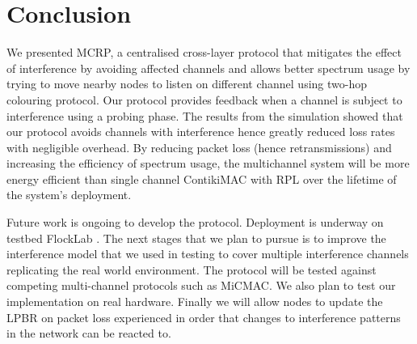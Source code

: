 \section{Conclusion}
\label{sec:conclusion}


We presented MCRP, a centralised cross-layer protocol that mitigates the effect of interference by avoiding affected channels and allows better spectrum usage by trying to move nearby nodes to listen on different channel using two-hop colouring protocol. Our protocol provides feedback when a channel is subject to interference using a probing phase.
The results from the simulation showed that our protocol avoids channels with interference hence greatly reduced loss rates with negligible overhead. By reducing packet loss (hence retransmissions) and increasing the efficiency of spectrum usage, the multichannel system will be more energy efficient than single channel ContikiMAC with RPL over the lifetime of the system's deployment.

Future work is ongoing to develop the protocol. Deployment is underway on testbed FlockLab \cite{flocklab}. The next stages that we plan to pursue is to improve the interference model that we used in testing to cover multiple interference channels replicating the real world environment. The protocol will be tested against competing multi-channel protocols such as MiCMAC. We also plan to test our implementation on real hardware.  Finally we will allow nodes to update the LPBR on packet loss experienced in order that changes to interference patterns in the network can be reacted to.


